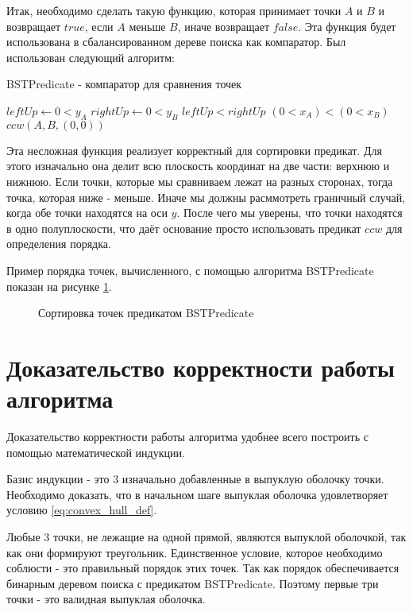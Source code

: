 Итак, необходимо сделать такую функцию, которая принимает точки $A$ и $B$ и возвращает $true$, если $A$ меньше $B$, иначе возвращает $false$. Эта функция будет использована в сбалансированном дереве поиска как компаратор. Был использован следующий алгоритм:

\begin{algorithm}[H]
	\caption{BSTPredicate - компаратор для сравнения точек}
	\label{alg:bst_predicate}
	\begin{algorithmic}[1]
		\State $leftUp \gets 0<y_A$
		\State $rightUp \gets 0<y_B$
			\Return $leftUp < rightUp$
		\EndIf
			\Return $(0<x_A) < (0<x_B)$
		\EndIf
		\Return $ccw(A, B, (0, 0))$
		\EndProcedure
	\end{algorithmic}
\end{algorithm}

Эта несложная функция реализует корректный для сортировки предикат. Для этого изначально она делит всю плоскость координат на две части: верхнюю и нижнюю. Если точки, которые мы сравниваем лежат на разных сторонах, тогда точка, которая ниже - меньше. Иначе мы должны расммотреть граничный случай, когда обе точки находятся на оси $y$. После чего мы уверены, что точки находятся в одно полуплоскости, что даёт основание просто использовать предикат $ccw$ для определения порядка.

Пример порядка точек, вычисленного, с помощью алгоритма BSTPredicate показан на рисунке \ref{img:BSTPred_ordering}.

\begin{figure}[H]
	\centering
	
	\caption{Сортировка точек предикатом BSTPredicate}
	\label{img:BSTPred_ordering}
\end{figure}

\section{Доказательство корректности работы алгоритма} \label{subsect2_3}

Доказательство корректности работы алгоритма удобнее всего построить с помощью математической индукции.

Базис индукции - это 3 изначально добавленные в выпуклую оболочку точки. Необходимо доказать, что в начальном шаге выпуклая оболочка удовлетворяет условию \ref{eq:convex_hull_def}.

Любые 3 точки, не лежащие на одной прямой, являются выпуклой оболочкой, так как они формируют треугольник. Единственное условие, которое необходимо соблюсти - это правильный порядок этих точек. Так как порядок обеспечивается бинарным деревом поиска с предикатом BSTPredicate. Поэтому первые три точки - это валидная выпуклая оболочка.

